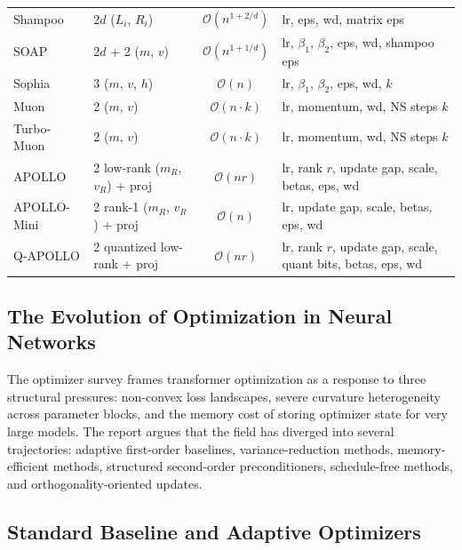 \documentclass[11pt,a4paper]{article}
\begin{document}
\begin{longtable}{llcl}
Shampoo & $2d$ ($L_i$, $R_i$) & $\mathcal{O}(n^{1+2/d})$ & lr, eps, wd, matrix eps \\
SOAP & $2d$ + 2 ($m$, $v$) & $\mathcal{O}(n^{1+1/d})$ & lr, $\beta_1$, $\beta_2$, eps, wd, shampoo eps \\
Sophia & 3 ($m$, $v$, $h$) & $\mathcal{O}(n)$ & lr, $\beta_1$, $\beta_2$, eps, wd, $k$ \\
Muon & 2 ($m$, $v$) & $\mathcal{O}(n \cdot k)$ & lr, momentum, wd, NS steps $k$ \\
Turbo-Muon & 2 ($m$, $v$) & $\mathcal{O}(n \cdot k)$ & lr, momentum, wd, NS steps $k$ \\
APOLLO & 2 low-rank ($m_R$, $v_R$) + proj & $\mathcal{O}(nr)$ & lr, rank $r$, update gap, scale, betas, eps, wd \\
APOLLO-Mini & 2 rank-1 ($m_R$, $v_R$) + proj & $\mathcal{O}(n)$ & lr, update gap, scale, betas, eps, wd \\
Q-APOLLO & 2 quantized low-rank + proj & $\mathcal{O}(nr)$ & lr, rank $r$, update gap, scale, quant bits, betas, eps, wd \\
\end{longtable}

\subsection{The Evolution of Optimization in Neural Networks}
The optimizer survey frames transformer optimization as a response to three structural pressures: non-convex loss landscapes, severe curvature heterogeneity across parameter blocks, and the memory cost of storing optimizer state for very large models. The report argues that the field has diverged into several trajectories: adaptive first-order baselines, variance-reduction methods, memory-efficient methods, structured second-order preconditioners, schedule-free methods, and orthogonality-oriented updates.

\subsection{Standard Baseline and Adaptive Optimizers}
\end{document}
